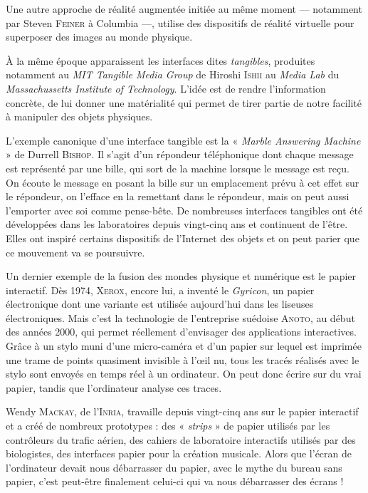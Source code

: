 Une autre approche de réalité augmentée initiée au même moment --- notamment par Steven \textsc{Feiner} à Columbia ---, utilise des dispositifs de réalité virtuelle pour superposer des images au monde physique.

À la même époque apparaissent les interfaces dites \emph{tangibles}, produites notamment au \textit{\textsc{MIT} Tangible Media Group} de Hiroshi \textsc{Ishii} au \textit{Media Lab} du \textit{Massachussetts Institute of Technology}. L’idée est de rendre l’information concrète, de lui donner une matérialité qui permet de tirer partie de notre facilité à manipuler des objets physiques. 

L’exemple canonique d’une interface tangible est la « \textit{Marble Answering Machine} » de Durrell \textsc{Bishop}. Il s’agit d’un répondeur téléphonique dont chaque message est représenté par une bille, qui sort de la machine lorsque le message est reçu.  On écoute le message en posant la bille sur un emplacement prévu à cet effet sur le répondeur, on l’efface en la remettant dans le répondeur, mais on peut aussi l’emporter avec soi comme pense-bête. De nombreuses interfaces tangibles ont été développées dans les laboratoires depuis vingt-cinq ans et continuent de l’être. Elles ont inspiré certains dispositifs de l’Internet des objets et on peut parier que ce mouvement va se poursuivre.

Un dernier exemple de la fusion des mondes physique et numérique est le papier interactif. Dès 1974, \textsc{Xerox}, encore lui, a inventé le \textit{Gyricon}, un papier électronique dont une variante est utilisée aujourd’hui dans les liseuses électroniques. Mais c’est la technologie de l’entreprise suédoise \textsc{Anoto}, au début des années 2000, qui permet réellement d’envisager des applications interactives. Grâce à un stylo muni d’une micro-caméra et d’un papier sur lequel est imprimée une trame de points quasiment invisible à l’œil nu, tous les tracés réalisés avec le stylo sont envoyés en temps réel à un ordinateur. On peut donc écrire sur du vrai papier, tandis que l’ordinateur analyse ces traces. 

Wendy \textsc{Mackay}, de l’\textsc{Inria}, travaille depuis vingt-cinq ans sur le papier interactif et a créé de nombreux prototypes : des « \textit{strips} » de papier utilisés par les contrôleurs du trafic aérien, des cahiers de laboratoire interactifs utilisés par des biologistes, des interfaces papier pour la création musicale. Alors que l’écran de l’ordinateur devait nous débarrasser du papier, avec le mythe du bureau sans papier, c’est peut-être finalement celui-ci qui va nous débarrasser des écrans !

